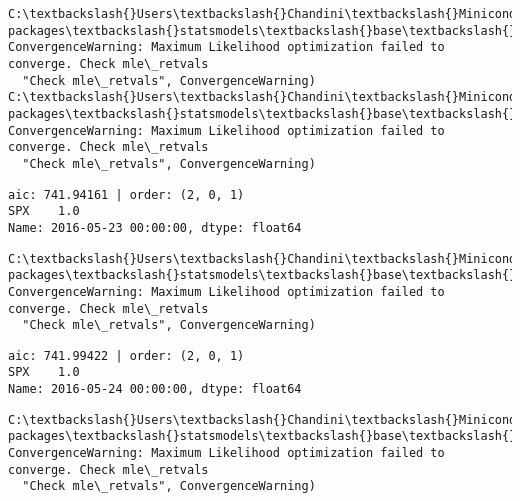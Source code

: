 \documentclass[11pt]{article}
\begin{document}
    \begin{Verbatim}[commandchars=\\\{\}]
C:\textbackslash{}Users\textbackslash{}Chandini\textbackslash{}Miniconda3\textbackslash{}envs\textbackslash{}auquan\textbackslash{}lib\textbackslash{}site-packages\textbackslash{}statsmodels\textbackslash{}base\textbackslash{}model.py:496: ConvergenceWarning: Maximum Likelihood optimization failed to converge. Check mle\_retvals
  "Check mle\_retvals", ConvergenceWarning)
C:\textbackslash{}Users\textbackslash{}Chandini\textbackslash{}Miniconda3\textbackslash{}envs\textbackslash{}auquan\textbackslash{}lib\textbackslash{}site-packages\textbackslash{}statsmodels\textbackslash{}base\textbackslash{}model.py:496: ConvergenceWarning: Maximum Likelihood optimization failed to converge. Check mle\_retvals
  "Check mle\_retvals", ConvergenceWarning)

    \end{Verbatim}

    \begin{Verbatim}[commandchars=\\\{\}]
aic: 741.94161 | order: (2, 0, 1)
SPX    1.0
Name: 2016-05-23 00:00:00, dtype: float64

    \end{Verbatim}

    \begin{Verbatim}[commandchars=\\\{\}]
C:\textbackslash{}Users\textbackslash{}Chandini\textbackslash{}Miniconda3\textbackslash{}envs\textbackslash{}auquan\textbackslash{}lib\textbackslash{}site-packages\textbackslash{}statsmodels\textbackslash{}base\textbackslash{}model.py:496: ConvergenceWarning: Maximum Likelihood optimization failed to converge. Check mle\_retvals
  "Check mle\_retvals", ConvergenceWarning)

    \end{Verbatim}

    \begin{Verbatim}[commandchars=\\\{\}]
aic: 741.99422 | order: (2, 0, 1)
SPX    1.0
Name: 2016-05-24 00:00:00, dtype: float64

    \end{Verbatim}

    \begin{Verbatim}[commandchars=\\\{\}]
C:\textbackslash{}Users\textbackslash{}Chandini\textbackslash{}Miniconda3\textbackslash{}envs\textbackslash{}auquan\textbackslash{}lib\textbackslash{}site-packages\textbackslash{}statsmodels\textbackslash{}base\textbackslash{}model.py:496: ConvergenceWarning: Maximum Likelihood optimization failed to converge. Check mle\_retvals
  "Check mle\_retvals", ConvergenceWarning)

    \end{Verbatim}
\end{document}
